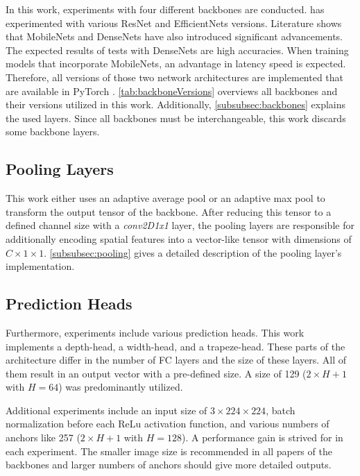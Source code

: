 In this work, experiments with four different backbones are conducted.
\cite{tepNet2024} has experimented with various ResNet and EfficientNets versions.
Literature shows that MobileNets and DenseNets have also introduced significant advancements.
The expected results of tests with DenseNets are high accuracies.
When training models that incorporate MobileNets, an advantage in latency speed is expected.
Therefore, all versions of those two network architectures are implemented that are available in PyTorch \cite{pytorchmobilenetv3} \cite{pytorchdensenet}.
\autoref{tab:backboneVersions} overviews all backbones and their versions utilized in this work.
Additionally, \autoref{subsubsec:backbones} explains the used layers.
Since all backbones must be interchangeable, this work discards some backbone layers.

\subsection{Pooling Layers}

This work either uses an adaptive average pool or an adaptive max pool to transform the output tensor of the backbone.
After reducing this tensor to a defined channel size with a \textit{conv2D1x1} layer, the pooling layers are responsible for additionally encoding spatial features into a vector-like tensor with dimensions of $C \times 1 \times 1$.
\autoref{subsubsec:pooling} gives a detailed description of the pooling layer's implementation.

\subsection{Prediction Heads}

Furthermore, experiments include various prediction heads.
This work implements a depth-head, a width-head, and a trapeze-head.
These parts of the architecture differ in the number of \ac{FC} layers and the size of these layers.
All of them result in an output vector with a pre-defined size.
A size of 129 ($2 \times H + 1$ with $H = 64$) was predominantly utilized.

\vspace{0.5cm}

\noindent Additional experiments include an input size of $3 \times 224 \times 224$, batch normalization before each ReLu activation function, and various numbers of anchors like 257 ($2 \times H + 1$ with $H = 128$).
A performance gain is strived for in each experiment.
The smaller image size is recommended in all papers of the backbones and larger numbers of anchors should give more detailed outputs.
 
